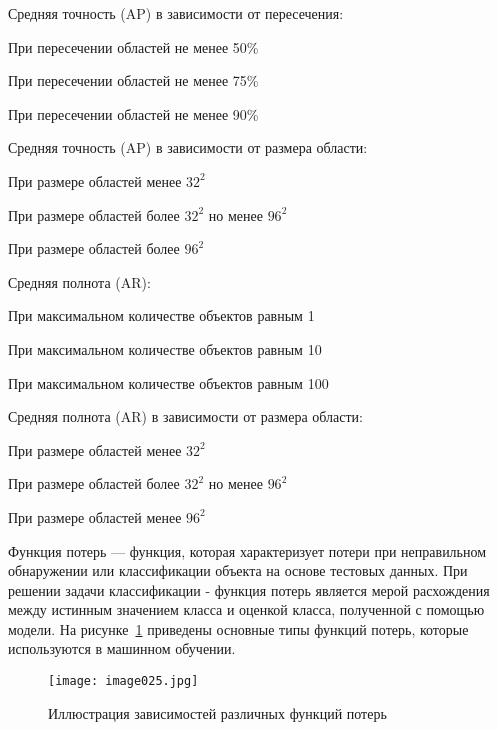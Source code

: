 %
\begin{itemize*}
  \item Средняя точность (AP) в зависимости от пересечения:
	\begin{itemize*}
	  \item При пересечении областей не менее 50\%
	  \item При пересечении областей не менее 75\%
	  \item При пересечении областей не менее 90\%	  
	\end{itemize*}
  \item Средняя точность (AP) в зависимости от размера области:
	\begin{itemize*}
	  \item При размере областей менее \(32^2\)
	  \item При размере областей более \(32^2\) но менее \(96^2\)
	  \item При размере областей более \(96^2\)
	\end{itemize*}
  \item Средняя полнота (AR):
	\begin{itemize*}
	  \item При максимальном количестве объектов равным 1
	  \item При максимальном количестве объектов равным 10
	  \item При максимальном количестве объектов равным 100
	\end{itemize*}
  \item Средняя полнота (AR) в зависимости от размера области:
	\begin{itemize*}
	  \item При размере областей менее \(32^2\)
	  \item При размере областей более \(32^2\) но менее \(96^2\)
	  \item При размере областей менее \(96^2\)
	\end{itemize*}
\end{itemize*}
%

Функция потерь — функция, которая характеризует потери при неправильном обнаружении или классификации объекта на основе тестовых данных. При решении задачи классификации - функция потерь является мерой расхождения между истинным значением класса и оценкой класса, полученной с помощью модели.
На рисунке~\ref{fig:lossfunctions}  приведены основные типы функций потерь, которые используются в машинном обучении.

\begin{figure}[htbp]
\centering
\texttt{[image: image025.jpg]}
\caption{Иллюстрация зависимостей различных функций потерь\cite{twentyone}}%
\label{fig:lossfunctions}
\end{figure}

